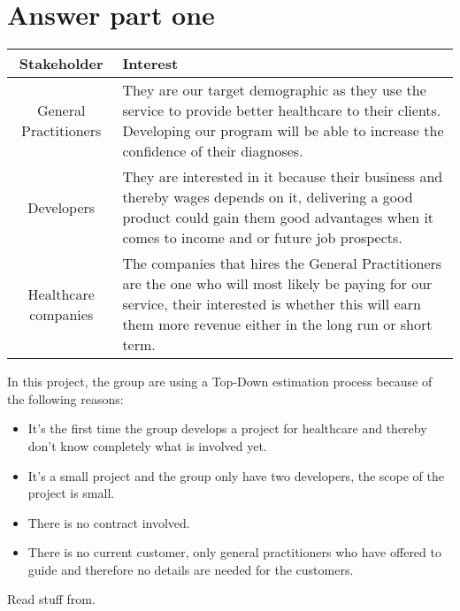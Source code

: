 \section{Answer part one}
\begin{center}
	\begin{tabular}[h]{|c|p{25em}|}
		\hline
		Stakeholder & Interest \\ \hline
		General Practitioners & They are our target demographic as they use the service to provide better healthcare to their clients. Developing our program will be able to increase the confidence of their diagnoses. \\ \hline
		Developers & They are interested in it because their business and thereby wages depends on it, delivering a good product could gain them good advantages when it comes to income and or future job prospects. \\ \hline
		Healthcare companies & The companies that hires the General Practitioners are the one who will most likely be paying for our service, their interested is whether this will earn them more revenue either in the long run or short term.\\ \hline
	\end{tabular}
\end{center}

In this project, the group are using a Top-Down estimation process because of the following reasons:
\begin{itemize}
	\item It's the first time the group develops a project for healthcare and thereby don't know completely what is involved yet.
	\item It's a small project and the group only have two developers, the scope of the project is small.
	\item There is no contract involved.
	\item There is no current customer, only general practitioners who have offered to guide and therefore no details are needed for the customers.
\end{itemize}






Read stuff from\cite{Larson2021}.